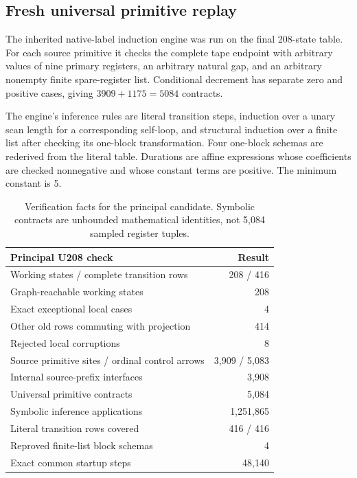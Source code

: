 \documentclass[11pt,letterpaper]{article}
\begin{document}
\subsection{Fresh universal primitive replay}

The inherited native-label induction engine was run on the final 208-state
table. For each source primitive it checks the complete tape endpoint
with arbitrary values of nine primary registers, an arbitrary natural
gap, and an arbitrary nonempty finite spare-register list. Conditional
decrement has separate zero and positive cases, giving
\(3909+1175=5084\) contracts.

The engine's inference rules are literal transition steps, induction over
a unary scan length for a corresponding self-loop, and structural induction
over a finite list after checking its one-block transformation. Four
one-block schemas are rederived from the literal table. Durations are
affine expressions whose coefficients are checked nonnegative and whose
constant terms are positive. The minimum constant is 5.

\begin{table}[ht]
\centering
\begin{tabular}{@{}lr@{}}
\toprule
Principal U208 check & Result\\
\midrule
Working states / complete transition rows & 208 / 416\\
Graph-reachable working states & 208\\
Exact exceptional local cases & 4\\
Other old rows commuting with projection & 414\\
Rejected local corruptions & 8\\
Source primitive sites / ordinal control arrows & 3,909 / 5,083\\
Internal source-prefix interfaces & 3,908\\
Universal primitive contracts & 5,084\\
Symbolic inference applications & 1,251,865\\
Literal transition rows covered & 416 / 416\\
Reproved finite-list block schemas & 4\\
Exact common startup steps & 48,140\\
\bottomrule
\end{tabular}
\caption{Verification facts for the principal candidate. Symbolic contracts
are unbounded mathematical identities, not 5,084 sampled register tuples.}
\label{tab:verification}
\end{table}
\end{document}
